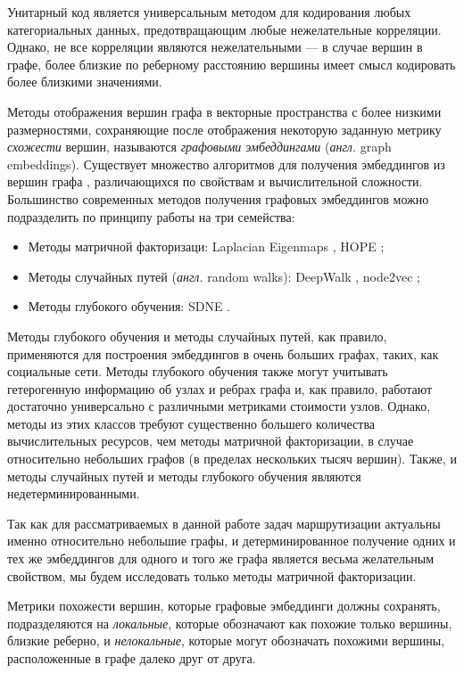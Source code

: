 \documentclass[specification,annotation,times]{itmo-student-thesis}
\theoremstyle{definition}
\begin{document}
Унитарный код является универсальным методом для кодирования любых
категориальных данных, предотвращающим любые нежелательные корреляции. Однако,
не все корреляции являются нежелательными --- в случае вершин в графе, более близкие
по реберному расстоянию вершины имеет смысл кодировать более близкими
значениями.

Методы отображения вершин графа в векторные пространства с более низкими
размерностями, сохраняющие после отображения некоторую заданную метрику
\textit{схожести} вершин, называются \textit{графовыми эмбеддингами}
(\textit{англ.} graph embeddings). Существует множество алгоритмов для получения
эмбеддингов из вершин графа \cite{cai2018comprehensive, goyal2018graph},
различающихся по свойствам и вычислительной сложности. Большинство современных
методов получения графовых эмбеддингов можно подразделить по принципу работы на
три семейства:

\begin{itemize}
\item Методы матричной факторизаци: Laplacian Eigenmaps
  \cite{belkin2002laplacian}, HOPE \cite{ou2016asymmetric};
\item Методы случайных путей (\textit{англ.} random walks): DeepWalk
  \cite{perozzi2014deepwalk}, node2vec \cite{grover2016node2vec};
\item Методы глубокого обучения: SDNE \cite{wang2016structural}.
\end{itemize}

Методы глубокого обучения и методы случайных путей, как правило, применяются для
построения эмбеддингов в очень больших графах, таких, как социальные сети.
Методы глубокого обучения также могут учитывать гетерогенную информацию об узлах
и ребрах графа и, как правило, работают достаточно универсально с различными
метриками стоимости узлов. Однако, методы из этих классов требуют существенно
большего количества вычислительных ресурсов, чем методы матричной факторизации,
в случае относительно небольших графов (в пределах нескольких тысяч вершин).
Также, и методы случайных путей и методы глубокого обучения являются
недетерминированными.

Так как для рассматриваемых в данной работе задач маршрутизации актуальны именно
относительно небольшие графы, и детерминированное получение одних и тех же
эмбеддингов для одного и того же графа является весьма желательным свойством, мы
будем исследовать только методы матричной факторизации.

Метрики похожести вершин, которые графовые эмбеддинги должны сохранять,
подразделяются на \textit{локальные}, которые обозначают как похожие только
вершины, близкие реберно, и \textit{нелокальные}, которые могут обозначать
похожими вершины, расположенные в графе далеко друг от друга.
\end{document}
